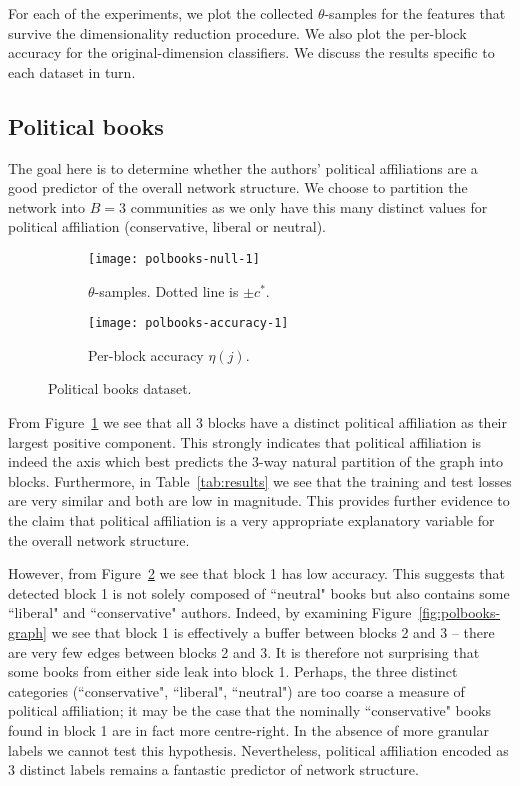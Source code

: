For each of the experiments, we plot the collected $\theta$-samples for the features that survive the dimensionality reduction procedure. We also plot the per-block accuracy for the original-dimension classifiers. We discuss the results specific to each dataset in turn.

\subsection{Political books}

The goal here is to 
determine whether the authors' political affiliations are a good predictor 
of the overall network structure. We choose to partition the network into $B=3$ communities as we only have this many distinct values for political affiliation (conservative, liberal or neutral).
%
\begin{figure}[!h]
	\centering
	\begin{subfigure}[t]{0.452\linewidth}
		\centering
		\vskip 0pt
		\texttt{[image: polbooks-null-1]}
		\caption{$\theta$-samples. Dotted line is $\pm c^*$.}
		\label{fig:polbooks-null}
	\end{subfigure}
	\begin{subfigure}[t]{0.45\linewidth}
		\centering
		\vskip 0pt
		\texttt{[image: polbooks-accuracy-1]}
		\caption{Per-block accuracy $\eta(j)$.}
		\label{fig:polbooks-accuracy}
	\end{subfigure}
	\caption{Political books dataset.}
	\label{fig:polbooks}
\end{figure}

From Figure~\ref{fig:polbooks-null} we see that all 3 blocks have a distinct political affiliation as their largest positive component. 
This strongly indicates that political affiliation is indeed the axis 
which best predicts the 3-way natural partition of the graph into blocks. 
Furthermore, in Table~\ref{tab:results} we see that the training and test losses 
are very similar and both are low in magnitude. This provides further evidence 
to the claim that political affiliation is a very appropriate explanatory 
variable for the overall network structure.

However, from Figure~\ref{fig:polbooks-accuracy} we see that block 1 has low accuracy. This suggests that detected block 1 is not solely composed of ``neutral" books but also contains some ``liberal" and ``conservative" authors. Indeed, by examining Figure~\ref{fig:polbooks-graph} we see that block 1 is effectively a buffer between blocks 2 and 3 -- there are very few edges between blocks 2 and 3. It is therefore not surprising that some books from either side leak into block 1. Perhaps, the three distinct categories (``conservative", ``liberal", ``neutral") are too coarse a measure of political affiliation; it may be the case that the nominally ``conservative" books found in block 1 are in fact more centre-right. In the absence of more granular labels we cannot test this hypothesis. Nevertheless, political affiliation encoded as 3 distinct labels remains a fantastic predictor of network structure.

